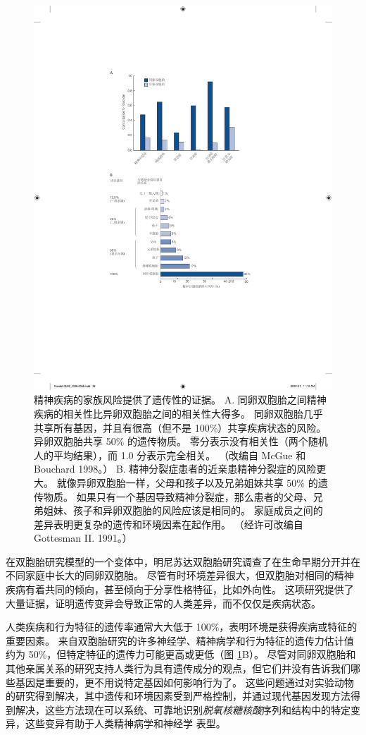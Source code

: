 \begin{figure}[htbp]
	\centering
	\includegraphics[width=0.5\linewidth]{chap02/fig_2_1}
	\caption{精神疾病的家族风险提供了遗传性的证据。 
		A. 同卵双胞胎之间精神疾病的相关性比异卵双胞胎之间的相关性大得多。 
		同卵双胞胎几乎共享所有基因，并且有很高（但不是 100\%）共享疾病状态的风险。 
		异卵双胞胎共享 50\% 的遗传物质。 
		零分表示没有相关性（两个随机人的平均结果），而 1.0 分表示完全相关。 
		（改编自 McGue 和 Bouchard 1998。） 
		B. 精神分裂症患者的近亲患精神分裂症的风险更大。 
		就像异卵双胞胎一样，父母和孩子以及兄弟姐妹共享 50\% 的遗传物质。 
		如果只有一个基因导致精神分裂症，那么患者的父母、兄弟姐妹、孩子和异卵双胞胎的风险应该是相同的。 
		家庭成员之间的差异表明更复杂的遗传和环境因素在起作用。 
		（经许可改编自 Gottesman II. 1991。）}
	\label{fig:2_1}
\end{figure}


在双胞胎研究模型的一个变体中，明尼苏达双胞胎研究调查了在生命早期分开并在不同家庭中长大的同卵双胞胎。
尽管有时环境差异很大，但双胞胎对相同的精神疾病有着共同的倾向，甚至倾向于分享性格特征，比如外向性。 
这项研究提供了大量证据，证明遗传变异会导致正常的人类差异，而不仅仅是疾病状态。

人类疾病和行为特征的遗传率通常大大低于 100\%，表明环境是获得疾病或特征的重要因素。 
来自双胞胎研究的许多神经学、精神病学和行为特征的遗传力估计值约为 50\%，但特定特征的遗传力可能更高或更低（图 \ref{fig:2_1}B）。 
尽管对同卵双胞胎和其他亲属关系的研究支持人类行为具有遗传成分的观点，但它们并没有告诉我们哪些基因是重要的，更不用说特定基因如何影响行为了。 
这些问题通过对实验动物的研究得到解决，其中遗传和环境因素受到严格控制，并通过现代基因发现方法得到解决，这些方法现在可以系统、可靠地识别\textit{脱氧核糖核酸}序列和结构中的特定变异，这些变异有助于人类精神病学和神经学 表型。


